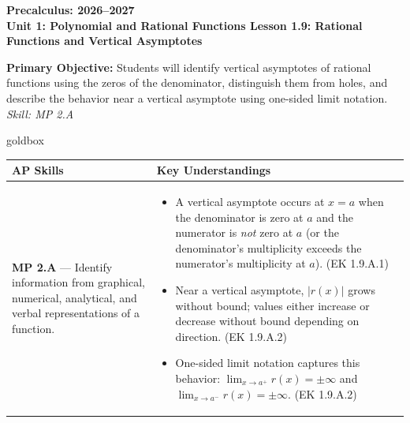\documentclass[10pt]{article}
\newcommand{\CourseName}{Precalculus}
\newcommand{\SchoolYear}{2026--2027}
\newcommand{\UnitNumberName}{Unit 1: Polynomial and Rational Functions \quad}
\newcommand{\LessonNumberName}{Lesson 1.9: Rational Functions and Vertical Asymptotes}
\begin{document}
\begin{center}
    {\Large\bfseries \CourseName: \SchoolYear \\
    {\small\bfseries \UnitNumberName \LessonNumberName}}
\end{center}

\begin{tcolorbox}[colback=sky, colframe=navy, boxrule=0.9pt, arc=2mm,
    left=2mm, right=2mm, top=1.5mm, bottom=1.5mm]
    \textbf{Primary Objective:} Students will identify vertical asymptotes of rational functions
    using the zeros of the denominator, distinguish them from holes, and describe the behavior
    near a vertical asymptote using one-sided limit notation.
    \hfill\textit{\small Skill: MP 2.A}
\end{tcolorbox}

\renewcommand{\arraystretch}{1.6}
\begin{skillbox}{goldbox}
\begin{tabularx}{\linewidth}{@{}X X@{}}
\textbf{AP Skills} &
\textbf{Key Understandings} \\
\midrule
\textbf{MP 2.A} --- Identify information from graphical, numerical, analytical,
and verbal representations of a function. &
\begin{itemize}[leftmargin=1.2em,itemsep=2pt,topsep=0pt]
  \item A vertical asymptote occurs at $x = a$ when the denominator is zero at $a$ and
        the numerator is \emph{not} zero at $a$ (or the denominator's multiplicity exceeds
        the numerator's multiplicity at $a$). (EK 1.9.A.1)
  \item Near a vertical asymptote, $|r(x)|$ grows without bound; values either increase
        or decrease without bound depending on direction. (EK 1.9.A.2)
  \item One-sided limit notation captures this behavior:
        $\lim_{x \to a^+} r(x) = \pm\infty$ and $\lim_{x \to a^-} r(x) = \pm\infty$.
        (EK 1.9.A.2)
\end{itemize} \\
\end{tabularx}
\end{skillbox}
\end{document}
